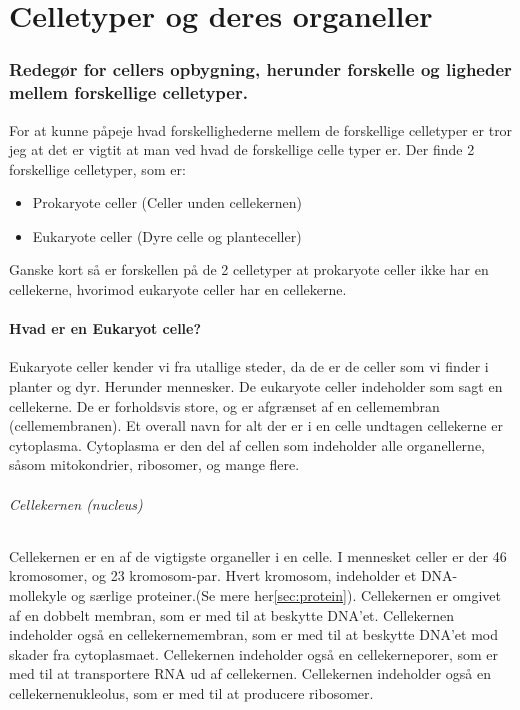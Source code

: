 \newpage
\part{Celletyper og deres organeller}\label{sec:celletyperogderesorganeller}
    \section*{Redegør for cellers opbygning, herunder forskelle og ligheder mellem forskellige celletyper.}
        For at kunne påpeje hvad forskellighederne mellem de forskellige celletyper er tror jeg at det er vigtit at man ved hvad de forskellige celle typer er. 
        Der finde 2 forskellige celletyper, som er:
        \begin{itemize}
            \item Prokaryote celler (Celler unden cellekernen)
            \item Eukaryote celler (Dyre celle og planteceller)
        \end{itemize}
        Ganske kort så er forskellen på de 2 celletyper at prokaryote celler ikke har en cellekerne, hvorimod eukaryote celler har en cellekerne.
        \subsection*{Hvad er en Eukaryot celle?}
            Eukaryote celler kender vi fra utallige steder, da de er de celler som vi finder i planter og dyr. Herunder mennesker.
            De eukaryote celler indeholder som sagt en cellekerne. De er forholdsvis store, og er afgrænset af en cellemembran (cellemembranen). 
            Et overall navn for alt der er i en celle undtagen cellekerne er cytoplasma. Cytoplasma er den del af cellen som indeholder alle organellerne, såsom mitokondrier, ribosomer, og mange flere.
            \paragraph{Cellekernen (nucleus)}
                Cellekernen er en af de vigtigste organeller i en celle. I mennesket celler er der 46 kromosomer, og 23 kromosom-par. Hvert kromosom, indeholder et DNA-mollekyle og særlige proteiner.(Se mere her\ref{sec:protein}).
                Cellekernen er omgivet af en dobbelt membran, som er med til at beskytte DNA'et. 
                Cellekernen indeholder også en cellekernemembran, som er med til at beskytte DNA'et mod skader fra cytoplasmaet.
                Cellekernen indeholder også en cellekerneporer, som er med til at transportere RNA ud af cellekernen.
                Cellekernen indeholder også en cellekernenukleolus, som er med til at producere ribosomer.
